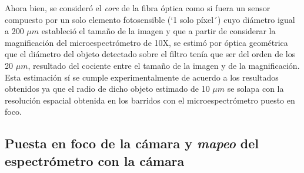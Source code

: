Ahora bien, se consideró el \textit{core} de la fibra óptica como si fuera un sensor compuesto por un solo elemento fotosensible (`1 solo píxel´) cuyo diámetro igual a 200 $\mu m$ estableció el tamaño de la imagen y que a partir de considerar la magnificación del microespectrómetro de 10X, se estimó por óptica geométrica que el diámetro del objeto detectado sobre el filtro tenía que ser del orden de los 20 $\mu m$, resultado del cociente entre el tamaño de la imagen y de la magnificación. Esta estimación sí se cumple experimentalmente de acuerdo a los resultados obtenidos ya que el radio de dicho objeto estimado de 10 $\mu m$ se solapa con la resolución espacial obtenida en los barridos con el microespectrómetro puesto en foco.


\singlespacing
\subsection{Puesta en foco de la cámara y \textit{mapeo} del espectrómetro con la cámara}
\label{sec:fococam}

